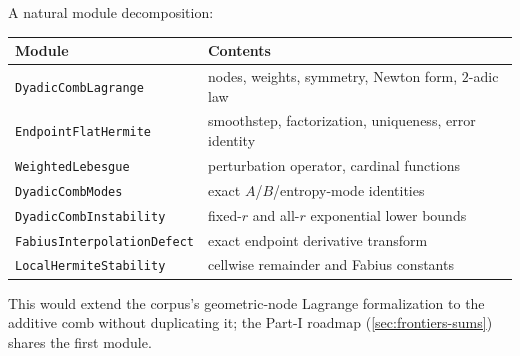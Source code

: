 A natural module decomposition:
\begin{center}
\small
\begin{tabular}{@{}ll@{}}
\toprule
Module & Contents \\
\midrule
\nolinkurl{DyadicCombLagrange} & nodes, weights, symmetry, Newton form, $2$-adic law \\
\nolinkurl{EndpointFlatHermite} & smoothstep, factorization, uniqueness, error identity \\
\nolinkurl{WeightedLebesgue} & perturbation operator, cardinal functions \\
\nolinkurl{DyadicCombModes} & exact $A$/$B$/entropy-mode identities \\
\nolinkurl{DyadicCombInstability} & fixed-$r$ and all-$r$ exponential lower bounds \\
\nolinkurl{FabiusInterpolationDefect} & exact endpoint derivative transform \\
\nolinkurl{LocalHermiteStability} & cellwise remainder and Fabius constants \\
\bottomrule
\end{tabular}
\end{center}
This would extend the corpus's geometric-node Lagrange formalization
to the additive comb without duplicating it; the Part-I roadmap
(\cref{sec:frontiers-sums}) shares the first module.
